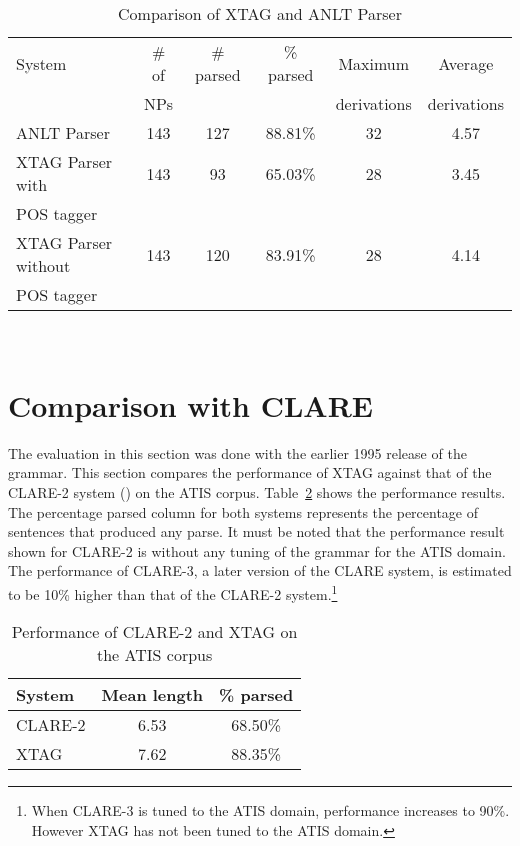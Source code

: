 \begin{table}[ht]
\centering
\begin{tabular}{|l|c|c|c|c|c|}  \hline
System & \# of & \# parsed & \% parsed & Maximum & Average \\
& NPs &&& derivations & derivations \\ \hline
ANLT Parser & 143 & 127 & 88.81\% & 32 & 4.57 \\ \hline
XTAG Parser with & 143 & 93 & 65.03\% & 28 & 3.45 \\
POS tagger & & & & & \\ \hline
XTAG Parser without & 143 & 120 & 83.91\% & 28 & 4.14\\
POS tagger & & & & & \\ \hline
\end{tabular} \\

\vspace{0.1in}

\caption{Comparison of XTAG and ANLT Parser}
\label{Alvey-xtag}
\end{table}


\section{Comparison with CLARE}

The evaluation in this section was done with the earlier 1995 release
of the grammar. This section compares the performance of XTAG against
that of the CLARE-2 system (\cite{clare-report92}) on the ATIS corpus.
Table~\ref{clare-results} shows the performance results. The
percentage parsed column for both systems represents the percentage of
sentences that produced any parse.  It must be noted that the
performance result shown for CLARE-2 is without any tuning of the
grammar for the ATIS domain. The performance of CLARE-3, a later
version of the CLARE system, is estimated to be 10\% higher than that
of the CLARE-2 system.\footnote{When CLARE-3 is tuned to the ATIS
  domain, performance increases to 90\%. However XTAG has not been
  tuned to the ATIS domain.}

\begin{table}[ht]
\centering
\begin{tabular}{|l|c|c|}  \hline
System & Mean length & \% parsed \\ \hline
CLARE-2  & 6.53 & 68.50\% \\ \hline
XTAG  & 7.62 & 88.35\% \\ \hline
\end{tabular}
\caption{Performance of CLARE-2 and XTAG on the ATIS corpus}
\label{clare-results}
\end{table}

